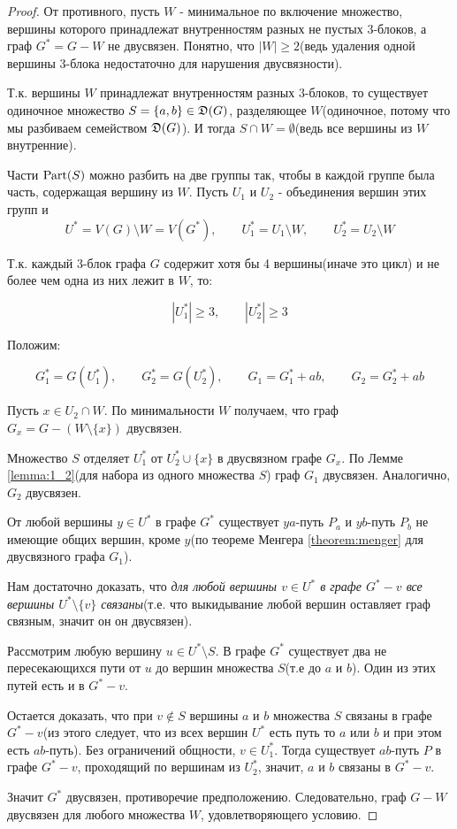 \begin{proof}
	От противного, пусть $W$ - минимальное по включение множество, вершины которого принадлежат внутренностям разных не пустых 3-блоков, а граф  $G^* = G - W$ не двусвязен.
	Понятно, что  $|W| \geqslant 2$(ведь удаления одной вершины 3-блока недостаточно для нарушения двусвязности).

	Т.к. вершины  $W$ принадлежат внутренностям разных  $3$-блоков, то существует одиночное множество  $S = \{a, b\} \in \mathfrak{D}(G)$, разделяющее  $W$(одиночное, потому что мы разбиваем семейством $\mathfrak{D}(G)$).
	И тогда $S \cap W = \emptyset$(ведь все вершины из $W$ внутренние).
 
	Части $\operatorname{Part}(S)$ можно разбить на две группы так, чтобы в каждой группе была часть, содержащая вершину из  $W$.
	Пусть  $U_1$ и  $U_2$ - объединения вершин этих групп и 
	\[
		U^* = V(G) \setminus W = V(G^*), \qquad U_1^* = U_1 \setminus W, \qquad U^*_2 = U_2 \setminus W
	\]

	Т.к. каждый 3-блок графа $G$ содержит хотя бы 4 вершины(иначе это цикл) и не более чем одна из них лежит в  $W$, то:

	\[
		|U_1^*| \geqslant 3, \qquad |U_2^*| \geqslant 3
	\] 

	Положим:

	\[
		G_1^* = G(U_1^*), \qquad G_2^* = G(U_2^*), \qquad G_1 = G_1^* + ab, \qquad G_2 = G_2^* + ab
	\] 

	Пусть $x \in U_2 \cap W$.
	По минимальности $W$ получаем, что граф  $G_x = G - (W \setminus \{x\})$ двусвязен.

	Множество $S$ отделяет  $U_1^*$ от  $U_2^* \cup \{x \}$ в двусвязном графе $G_x$.
	По Лемме \ref{lemma:1_2}(для набора из одного множества $S$) граф $G_1$ двусвязен.
	Аналогично,  $G_2$ двусвязен.

	От любой вершины  $y \in U^*$ в графе  $G^*$ существует  $ya$-путь  $P_a$ и  $yb$-путь  $P_b$ не имеющие общих вершин, кроме  $y$(по теореме Менгера \ref{theorem:menger} для двусвязного графа  $G_1$). 

	Нам достаточно доказать, что \textit{для любой вершины $v \in U^*$ в графе  $G^* - v$ все вершины  $U^* \setminus \{v\}$ связаны}(т.е. что выкидывание любой вершин оставляет граф связным, значит он он двусвязен).

	Рассмотрим любую вершину $u \in U^* \setminus S$.
	В графе  $G^*$ существует два не пересекающихся пути от  $u$ до вершин множества  $S$(т.е до $a$ и  $b$).
	Один из этих путей есть и в  $G^* - v$.

	Остается доказать, что при  $v \not \in S$ вершины  $a$ и  $b$ множества  $S$ связаны в графе  $G^* - v$(из этого следует, что из всех вершин $U^*$ есть путь то $a$ или $b$ и при этом есть  $ab$-путь).
	Без ограничений общности, $v \in U_1^*$.
	Тогда существует $ab$-путь $P$ в графе $G^* - v$, проходящий по вершинам из $U_2^*$, значит, $a$ и $b$ связаны в  $G^* - v$.

	Значит $G^*$ двусвязен, противоречие предположению.
	Следовательно, граф $G - W$ двусвязен для любого множества $W$, удовлетворяющего условию.
\end{proof}

